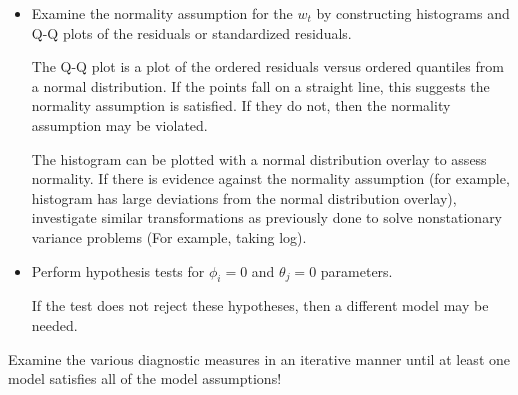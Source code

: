 \documentclass[
]{book}
\theoremstyle{definition}
\theoremstyle{definition}
\theoremstyle{definition}
\theoremstyle{definition}
\theoremstyle{remark}
\begin{document}
\begin{itemize}
\item
  Examine the normality assumption for the \(w_t\) by constructing histograms and Q-Q plots of the residuals or standardized residuals.

  The Q-Q plot is a plot of the ordered residuals versus ordered quantiles from a normal distribution. If the points fall on a straight line, this suggests the normality assumption is satisfied. If they do not, then the normality assumption may be violated.

  The histogram can be plotted with a normal distribution overlay to assess normality. If there is evidence against the normality assumption (for example, histogram has large deviations from the normal distribution overlay), investigate similar transformations as previously done to solve nonstationary variance problems (For example, taking log).
\item
  Perform hypothesis tests for \(\phi_i=0\) and \(\theta_j=0\) parameters.

  If the test does not reject these hypotheses, then a different model may be needed.
\end{itemize}

Examine the various diagnostic measures in an iterative manner until at least one model satisfies all of the model assumptions!
\end{document}
